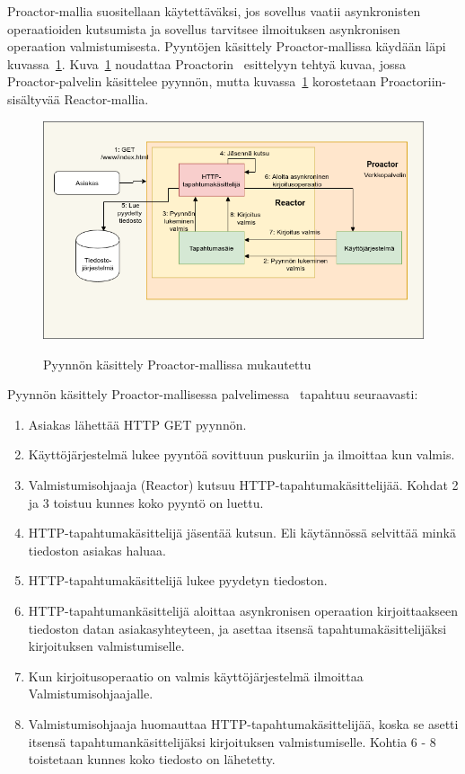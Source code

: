 \documentclass[finnish]{tktltiki2}%
\theoremstyle{definition}
\theoremstyle{remark}
\begin{document}
Proactor-mallia suositellaan käytettäväksi, jos sovellus vaatii
asynkronisten operaatioiden kutsumista ja sovellus tarvitsee ilmoituksen
asynkronisen operaation valmistumisesta.
Pyyntöjen käsittely Proactor-mallissa käydään läpi kuvassa~\ref{fig:proactor}.
Kuva~\ref{fig:proactor} noudattaa Proactorin~\cite{hu_applying_1998} esittelyyn tehtyä
kuvaa, jossa Proactor-palvelin käsittelee pyynnön, mutta kuvassa~\ref{fig:proactor}
korostetaan Proactoriin-sisältyvää Reactor-mallia.
\begin{figure}
  \caption{Pyynnön käsittely Proactor-mallissa mukautettu~\cite{hu_applying_1998}}
  \includegraphics[scale=0.5]{Proactor.png}\label{fig:proactor}
\end{figure}
Pyynnön käsittely Proactor-mallisessa palvelimessa~\cite{hu_applying_1998} 
tapahtuu seuraavasti:
    \begin{enumerate}
      \item Asiakas lähettää HTTP GET pyynnön.
      \item Käyttöjärjestelmä lukee pyyntöä sovittuun puskuriin ja ilmoittaa kun valmis.
      \item Valmistumisohjaaja (Reactor) kutsuu HTTP-tapahtumakäsittelijää.
        Kohdat 2 ja 3 toistuu kunnes koko pyyntö on luettu.
      \item HTTP-tapahtumakäsittelijä jäsentää kutsun. Eli
        käytännössä selvittää minkä tiedoston asiakas haluaa.
      \item HTTP-tapahtumakäsittelijä lukee pyydetyn tiedoston.
      \item HTTP-tapahtumankäsittelijä aloittaa asynkronisen operaation
        kirjoittaakseen tiedoston datan asiakasyhteyteen, ja asettaa
        itsensä tapahtumakäsittelijäksi kirjoituksen valmistumiselle.
      \item Kun kirjoitusoperaatio on valmis käyttöjärjestelmä ilmoittaa
        Valmistumisohjaajalle.
      \item Valmistumisohjaaja huomauttaa HTTP-tapahtumakäsittelijää,
        koska se asetti itsensä tapahtumankäsittelijäksi kirjoituksen
        valmistumiselle. Kohtia 6 - 8 toistetaan kunnes koko tiedosto on lähetetty.
    \end{enumerate}
\end{document}
